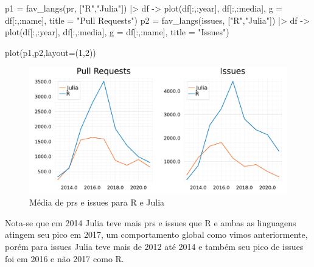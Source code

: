 \documentclass[
  letterpaper,
  DIV=11,
  numbers=noendperiod]{scrartcl}
\newenvironment{Shaded}{\begin{snugshade}}{\end{snugshade}}
\newcommand{\FloatTok}[1]{\textcolor[rgb]{0.68,0.00,0.00}{#1}}
\newcommand{\FunctionTok}[1]{\textcolor[rgb]{0.28,0.35,0.67}{#1}}
\newcommand{\NormalTok}[1]{\textcolor[rgb]{0.00,0.23,0.31}{#1}}
\newcommand{\OperatorTok}[1]{\textcolor[rgb]{0.37,0.37,0.37}{#1}}
\newcommand{\StringTok}[1]{\textcolor[rgb]{0.13,0.47,0.30}{#1}}
\begin{document}
\begin{Shaded}
\begin{Highlighting}[]
\NormalTok{p1 }\OperatorTok{=} \FunctionTok{fav\_langs}\NormalTok{(pr, [}\StringTok{"R"}\NormalTok{,}\StringTok{"Julia"}\NormalTok{]) }\OperatorTok{|\textgreater{}} 
\NormalTok{      df }\OperatorTok{{-}\textgreater{}} \FunctionTok{plot}\NormalTok{(df[}\OperatorTok{:}\NormalTok{,}\OperatorTok{:}\NormalTok{year], df[}\OperatorTok{:}\NormalTok{,}\OperatorTok{:}\NormalTok{media], g }\OperatorTok{=}\NormalTok{ df[}\OperatorTok{:}\NormalTok{,}\OperatorTok{:}\NormalTok{name], title }\OperatorTok{=} \StringTok{"Pull Requests"}\NormalTok{)}
\NormalTok{p2 }\OperatorTok{=} \FunctionTok{fav\_langs}\NormalTok{(issues, [}\StringTok{"R"}\NormalTok{,}\StringTok{"Julia"}\NormalTok{]) }\OperatorTok{|\textgreater{}} 
\NormalTok{      df }\OperatorTok{{-}\textgreater{}} \FunctionTok{plot}\NormalTok{(df[}\OperatorTok{:}\NormalTok{,}\OperatorTok{:}\NormalTok{year], df[}\OperatorTok{:}\NormalTok{,}\OperatorTok{:}\NormalTok{media], g }\OperatorTok{=}\NormalTok{ df[}\OperatorTok{:}\NormalTok{,}\OperatorTok{:}\NormalTok{name], title }\OperatorTok{=} \StringTok{"Issues"}\NormalTok{)}

\FunctionTok{plot}\NormalTok{(p1,p2,layout}\OperatorTok{=}\NormalTok{(}\FloatTok{1}\NormalTok{,}\FloatTok{2}\NormalTok{))}
\end{Highlighting}
\end{Shaded}

\begin{figure}[H]

{\centering \includegraphics{report_files/figure-pdf/cell-10-output-1.pdf}

}

\caption{Média de prs e issues para R e Julia}

\end{figure}

Nota-se que em 2014 Julia teve mais prs e issues que R e ambas as
linguagens atingem seu pico em 2017, um comportamento global como vimos
anteriormente, porém para issues Julia teve mais de 2012 até 2014 e
também seu pico de issues foi em 2016 e não 2017 como R.
\end{document}
